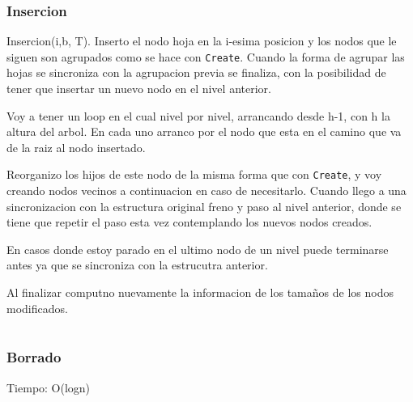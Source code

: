 \documentclass[10pt,handout]{beamer}
\begin{document}

\begin{frame}
\frametitle{Insercion}
  Insercion(i,b, T). Inserto el nodo hoja en la i-esima posicion y los nodos que le siguen son agrupados
  como se hace con  \texttt{Create}.
  Cuando la forma de agrupar las hojas se sincroniza con la agrupacion previa se finaliza, con
  la posibilidad de tener que insertar un nuevo nodo en el nivel anterior.

  Voy a tener un loop en el cual nivel por nivel, arrancando desde h-1, con h la altura del arbol.
  En cada uno arranco por el nodo que esta en el camino que va de la raiz al nodo insertado.

  Reorganizo los hijos de este nodo de la misma forma que con \texttt{Create}, y voy creando
  nodos vecinos a continuacion en caso de necesitarlo.
  Cuando llego a una sincronizacion con la estructura original freno y paso al nivel anterior, donde
  se tiene que repetir el paso esta vez contemplando los nuevos nodos creados.

  En casos donde estoy parado en el ultimo nodo de un nivel puede terminarse antes ya que se sincroniza
  con la estrucutra anterior.

   Al finalizar computno nuevamente la informacion de los tamaños de los nodos modificados.
\end{frame}


\section{}
\begin{frame}
\frametitle{}


\end{frame}


\section{}
\begin{frame}
\frametitle{Borrado}

  Tiempo: O(logn)

\end{frame}
\end{document}
